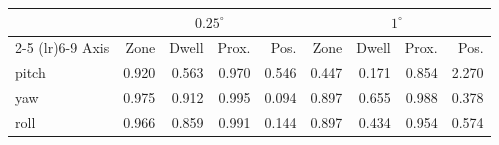 \begin{tabular}{lrrrrrrrr}
\toprule
 & \multicolumn{4}{c}{$0.25^\circ$} & \multicolumn{4}{c}{$1^\circ$} \\
\cmidrule(lr){2-5} \cmidrule(lr){6-9}
Axis & Zone & Dwell & Prox. & Pos. & Zone & Dwell & Prox. & Pos. \\
\midrule
pitch & 0.920 & 0.563 & 0.970 & 0.546 & 0.447 & 0.171 & 0.854 & 2.270 \\
yaw & 0.975 & 0.912 & 0.995 & 0.094 & 0.897 & 0.655 & 0.988 & 0.378 \\
roll & 0.966 & 0.859 & 0.991 & 0.144 & 0.897 & 0.434 & 0.954 & 0.574 \\
\bottomrule
\end{tabular}
